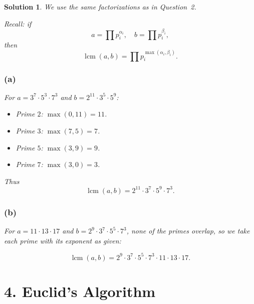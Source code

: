 \documentclass[11pt]{article}
\newtheorem*{solution}{Solution}
\begin{document}
\begin{solution}
We use the same factorizations as in Question~2.

Recall: if
\[
a = \prod p_i^{\alpha_i},\quad b = \prod p_i^{\beta_i},
\]
then
\[
\operatorname{lcm}(a,b) = \prod p_i^{\max(\alpha_i,\beta_i)}.
\]

\subsubsection*{(a)}
For $a = 3^7 \cdot 5^3 \cdot 7^3$ and $b = 2^{11} \cdot 3^5 \cdot 5^9$:

\begin{itemize}
  \item Prime $2$: $\max(0,11) = 11$.
  \item Prime $3$: $\max(7,5) = 7$.
  \item Prime $5$: $\max(3,9) = 9$.
  \item Prime $7$: $\max(3,0) = 3$.
\end{itemize}

Thus
\[
\operatorname{lcm}(a,b) = 2^{11} \cdot 3^7 \cdot 5^9 \cdot 7^3.
\]

\subsubsection*{(b)}
For $a = 11 \cdot 13 \cdot 17$ and $b = 2^9 \cdot 3^7 \cdot 5^5 \cdot 7^3$, none of the primes overlap, so we take each prime with its exponent as given:

\[
\operatorname{lcm}(a,b) = 2^9 \cdot 3^7 \cdot 5^5 \cdot 7^3 \cdot 11 \cdot 13 \cdot 17.
\]
\end{solution}

\section*{4. Euclid's Algorithm}
\end{document}
